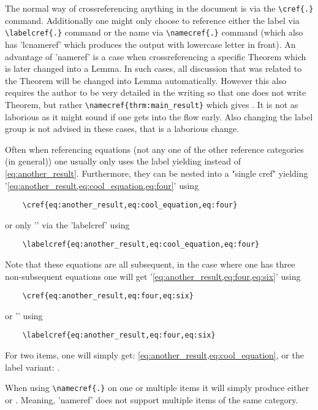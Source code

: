 \documentclass[../thesis.tex]{subfiles}
\begin{document}
The normal way of crossreferencing anything in the document is via the \verb|\cref{.}| command. Additionally one might only choose to reference either the label via \verb|\labelcref{.}| command or the name via \verb|\namecref{.}| command (which also has 'lcnameref' which produces the output with lowercase letter in front). An advantage of 'nameref' is a case when crossreferencing a specific Theorem which is later changed into a Lemma. In such cases, all discussion that was related to the Theorem will be changed into Lemma automatically. However this also requires the author to be very detailed in the writing so that one does not write Theorem, but rather \verb|\namecref{thrm:main_result}| which gives . It is not as laborious as it might sound if one gets into the flow early. Also changing the label group is not advised in these cases, that is a laborious change.

Often when referencing equations (not any one of the other reference categories (in general)) one usually only uses the label yielding  instead of \cref{eq:another_result}.
Furthermore, they can be nested into a "single cref" yielding '\cref{eq:another_result,eq:cool_equation,eq:four}' using 
\begin{verbatim}
    \cref{eq:another_result,eq:cool_equation,eq:four} 
\end{verbatim}
or only '' via the 'labelcref' using
\begin{verbatim}
    \labelcref{eq:another_result,eq:cool_equation,eq:four} 
\end{verbatim}
Note that these equations are all subsequent, in the case where one has three non-subsequent equations one will get '\cref{eq:another_result,eq:four,eq:six}' using 
\begin{verbatim}
    \cref{eq:another_result,eq:four,eq:six} 
\end{verbatim}
or '' using
\begin{verbatim}
    \labelcref{eq:another_result,eq:four,eq:six} 
\end{verbatim}
For two items, one will simply get: \cref{eq:another_result,eq:cool_equation}, or the label variant: . 

When using \verb|\namecref{.}| on one or multiple items it will simply produce either  or . Meaning, 'nameref' does not support multiple items of the same category.  
\end{document}
